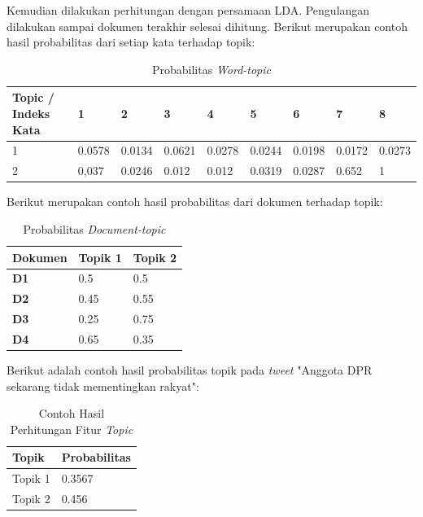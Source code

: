 Kemudian dilakukan perhitungan dengan persamaan LDA. Pengulangan dilakukan sampai dokumen terakhir selesai dihitung. Berikut merupakan contoh hasil probabilitas dari setiap kata terhadap topik:

\begin{table}[H]
	\caption{Probabilitas \textit{Word-topic}}
	\centering
	\small
	\begin{adjustbox}{width=1\textwidth}
	\begin{tabular}{|p{2cm}|p{1cm}|p{1cm}|p{1cm}|p{1cm}|p{1cm}|p{1cm}|p{1cm}|p{1cm}|}
		\hline
		\textbf{Topic / Indeks Kata} & \textbf{1} & \textbf{2} & \textbf{3} & \textbf{4} & \textbf{5} & \textbf{6} & \textbf{7} & \textbf{8} \\
		\hline
		1 & 0.0578 & 0.0134 & 0.0621 & 0.0278 & 0.0244 & 0.0198 & 0.0172 & 
		0.0273 \\
		\hline
		2 & 0,037 & 0.0246 & 0.012 & 0.012 & 0.0319 & 0.0287 & 0.652 & 1 \\
		\hline
	\end{tabular}
	\end{adjustbox}
\end{table}
\noindent Berikut merupakan contoh hasil probabilitas dari dokumen terhadap topik:

\begin{table}[H]
	\caption{Probabilitas \textit{Document-topic}}
	\centering
	\small
	\begin{adjustbox}{width=1\textwidth}
	\begin{tabular}{|p{4.5cm}|p{4cm}|p{4cm}|}
		\hline
		\textbf{Dokumen} & \textbf{Topik 1} & \textbf{Topik 2 }\\
		\hline
		\textbf{D1} & 0.5 & 0.5 \\
		\hline
		\textbf{D2} & 0.45 & 0.55 \\
		\hline
		\textbf{D3} & 0.25 & 0.75 \\
		\hline
		\textbf{D4} & 0.65 & 0.35 \\
		\hline
	\end{tabular}
	\end{adjustbox}
\end{table}
\noindent Berikut adalah contoh hasil probabilitas topik pada \textit{tweet} 
"Anggota DPR sekarang tidak mementingkan rakyat":
\begin{table}[H]
	\caption{Contoh Hasil Perhitungan Fitur \textit{Topic}}
	\centering
	\small
	\begin{adjustbox}{width=1\textwidth}
	\begin{tabular}{|p{8cm}|p{5cm}|}
		\hline
		\textbf{Topik} & \textbf{Probabilitas} \\
		\hline
		Topik 1 & 0.3567 \\
		\hline
		Topik 2 & 0.456 \\
		\hline
	\end{tabular}
	\end{adjustbox}
\end{table}
